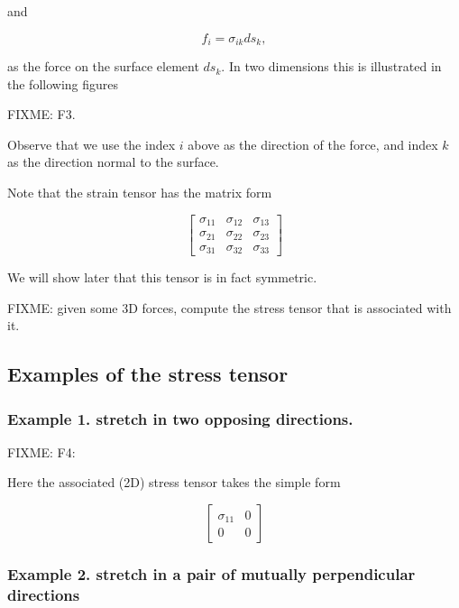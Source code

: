 and 

\begin{equation}\label{eqn:continuumL3:330}
f_i = \sigma_{ik} ds_k,
\end{equation}

as the force on the surface element $ds_k$.  In two dimensions this is illustrated in the following figures

FIXME: F3.

Observe that we use the index $i$ above as the direction of the force, and index $k$ as the direction normal to the surface.

Note that the strain tensor has the matrix form

\begin{equation}\label{eqn:continuumL3:350}
\begin{bmatrix}
\sigma_{11} & \sigma_{12} & \sigma_{13} \\
\sigma_{21} & \sigma_{22} & \sigma_{23} \\
\sigma_{31} & \sigma_{32} & \sigma_{33}
\end{bmatrix}
\end{equation}

We will show later that this tensor is in fact symmetric.

FIXME: given some 3D forces, compute the stress tensor that is associated with it.

\subsection{Examples of the stress tensor}

\subsubsection{Example 1.  stretch in two opposing directions.}

FIXME: F4: 

Here the associated (2D) stress tensor takes the simple form

\begin{equation}\label{eqn:continuumL3:370}
\begin{bmatrix}
\sigma_{11} & 0 \\
0 & 0
\end{bmatrix}
\end{equation}

\subsubsection{Example 2.  stretch in a pair of mutually perpendicular directions}

